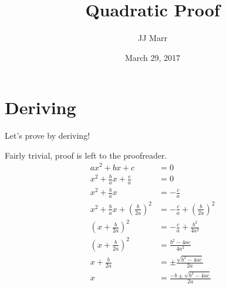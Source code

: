 \documentclass[letterpaper, 12pt]{article} %
\title{Quadratic Proof} %
\author{JJ Marr} %
\date{March 29, 2017} %
\begin{document}
	\maketitle %
	\tableofcontents %
	\newpage %
	\section{Deriving} %
	Let's prove by deriving!
	
	Fairly trivial, proof is left to the proofreader.
	\begin{align*}
		ax^2 + bx + c &= 0\\
		x^2 + \frac{b}{a}x + \frac{c}{a} &= 0\\
		x^2 + \frac{b}{a}x &= - \frac{c}{a}\\
		x^2 + \frac{b}{a}x + (\frac{b}{2a})^2 &= - \frac{c}{a} + (\frac{b}{2a})^2\\
		(x + \frac{b}{2a})^2 &= - \frac{c}{a} + \frac{b^2}{4a^2}\\
		(x + \frac{b}{2a})^2 &= \frac{b^2 - 4ac}{4a^2}\\
		x + \frac{b}{2a} &= \pm\frac{\sqrt{b^2 - 4ac}}{2a}\\
		x &= \frac{- b \pm \sqrt{b^2 - 4ac}}{2a}
	\end{align*}
\end{document}

